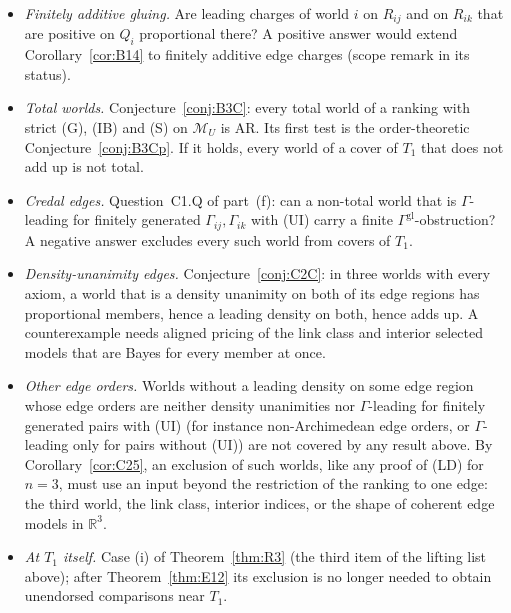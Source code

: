 \documentclass[11pt]{article}
\theoremstyle{definition}
\theoremstyle{remark}
\newcommand{\R}{\mathbb R}
\newcommand{\M}{\mathcal M}
\begin{document}
\begin{itemize}[leftmargin=*]
\item \emph{Finitely additive gluing.} Are leading charges of world $i$ on $R_{ij}$ and on $R_{ik}$ that are positive on $Q_i$ proportional there? A positive answer would extend Corollary~\ref{cor:B14} to finitely additive edge charges (scope remark in its status).
\item \emph{Total worlds.} Conjecture~\ref{conj:B3C}: every total world of a ranking with strict (G), (IB) and (S) on $\M_U$ is AR. Its first test is the order-theoretic Conjecture~\ref{conj:B3Cp}. If it holds, every world of a cover of $T_1$ that does not add up is not total.
\item \emph{Credal edges.} Question~C1.Q of part~(f): can a non-total world that is $\Gamma$-leading for finitely generated $\Gamma_{ij},\Gamma_{ik}$ with (UI) carry a finite $\Gamma^{\mathrm{gl}}$-obstruction? A negative answer excludes every such world from covers of $T_1$.
\item \emph{Density-unanimity edges.} Conjecture~\ref{conj:C2C}: in three worlds with every axiom, a world that is a density unanimity on both of its edge regions has proportional members, hence a leading density on both, hence adds up. A counterexample needs aligned pricing of the link class and interior selected models that are Bayes for every member at once.
\item \emph{Other edge orders.} Worlds without a leading density on some edge region whose edge orders are neither density unanimities nor $\Gamma$-leading for finitely generated pairs with (UI) (for instance non-Archimedean edge orders, or $\Gamma$-leading only for pairs without (UI)) are not covered by any result above. By Corollary~\ref{cor:C25}, an exclusion of such worlds, like any proof of (LD) for $n=3$, must use an input beyond the restriction of the ranking to one edge: the third world, the link class, interior indices, or the shape of coherent edge models in $\R^3$.
\item \emph{At $T_1$ itself.} Case (i) of Theorem~\ref{thm:R3} (the third item of the lifting list above); after Theorem~\ref{thm:E12} its exclusion is no longer needed to obtain unendorsed comparisons near $T_1$.

\end{itemize}
\end{document}
